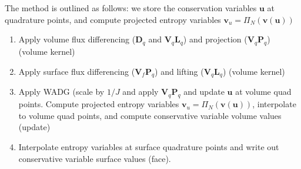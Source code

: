 \documentclass[preprint,10pt]{article}
\theoremstyle{definition}
\theoremstyle{lemma}
\theoremstyle{theorem}
\theoremstyle{assumption}
\newcommand{\LRp}[1]{\left( #1 \right)}
\begin{document}
The method is outlined as follows: we store the conservation variables $\bm{u}$ at quadrature points, and compute projected entropy variables $\bm{v}_u = \Pi_N\LRp{\bm{v}(\bm{u})}$ 
\begin{enumerate}
\item Apply volume flux differencing ($\bm{D}_q$ and $\bm{V}_q\bm{L}_q$) and projection ($\bm{V}_q\bm{P}_q$) (volume kernel)
\item Apply surface flux differencing ($\bm{V}_f\bm{P}_q$) and lifting ($\bm{V}_q\bm{L}_q$) (volume kernel)
\item Apply WADG (scale by $1/J$ and apply $\bm{V}_q\bm{P}_q$ and update $\bm{u}$ at volume quad points.  Compute projected entropy variables $\bm{v}_u = \Pi_N\LRp{\bm{v}(\bm{u})}$, interpolate to volume quad points, and compute conservative variable volume values (update)
\item Interpolate entropy variables at surface quadrature points and write out conservative variable surface values (face).  
\end{enumerate}



\end{document}

